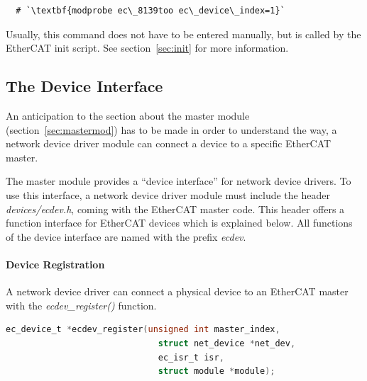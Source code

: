 \documentclass[a4paper,12pt,BCOR6mm,bibtotoc,idxtotoc]{scrbook}
\begin{document}
\begin{lstlisting}
  # `\textbf{modprobe ec\_8139too ec\_device\_index=1}`
\end{lstlisting}

Usually, this command does not have to be entered manually, but is
called by the EtherCAT init script. See section~\ref{sec:init} for
more information.


\subsection{The Device Interface}
\label{sec:ecdev}

An anticipation to the section about the master module
(section~\ref{sec:mastermod}) has to be made in order to understand
the way, a network device driver module can connect a device to a
specific EtherCAT master.

The master module provides a ``device interface'' for network device
drivers. To use this interface, a network device driver module must
include the header
\textit{devices/ecdev.h}, coming
with the EtherCAT master code. This header offers a function interface
for EtherCAT devices which is explained below. All functions of the
device interface are named with the prefix \textit{ecdev}.

\paragraph{Device Registration}

A network device driver can connect a physical device to an EtherCAT
master with the \textit{ecdev\_register()} function.

\begin{lstlisting}[language=C]
  ec_device_t *ecdev_register(unsigned int master_index,
                              struct net_device *net_dev,
                              ec_isr_t isr,
                              struct module *module);
\end{lstlisting}
\end{document}
